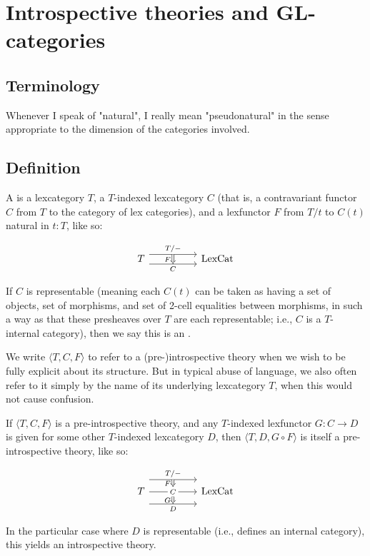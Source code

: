 \section{Introspective theories and GL-categories}

\subsection{Terminology}
Whenever I speak of "natural", I really mean "pseudonatural" in the sense appropriate to the dimension of the categories involved.

\subsection{Definition}
\begin{definition}
A  is a lexcategory $T$, a $T$-indexed lexcategory $C$ (that is, a contravariant functor $C$ from $T$ to the category of lex categories), and a lexfunctor $F$ from $T/t$ to $C(t)$ natural in $t : T$, like so:

\[\begin{tikzcd}
	{T} && {\LexCat}
	\arrow["{T/-}"{name=0}, from=1-1, to=1-3, shift left=2]
	\arrow["{C}"{name=1, swap}, from=1-1, to=1-3, shift right=2]
	\arrow[Rightarrow, "{F}"', from=0, to=1]
\end{tikzcd}\]

If $C$ is representable (meaning each $C(t)$ can be taken as having a set of objects, set of morphisms, and set of 2-cell equalities between morphisms, in such a way as that these presheaves over $T$ are each representable; i.e., $C$ is a $T$-internal category), then we say this is an .
\end{definition}

We write $\langle T, C, F \rangle$ to refer to a (pre-)introspective theory when we wish to be fully explicit about its structure. But in typical abuse of language, we also often refer to it simply by the name of its underlying lexcategory $T$, when this would not cause confusion.

\begin{construction}
If $\langle T, C, F \rangle$ is a pre-introspective theory, and any $T$-indexed lexfunctor $G : C \to D$ is given for some other $T$-indexed lexcategory $D$, then $\langle T, D, G \circ F \rangle$ is itself a pre-introspective theory, like so: 

\[\begin{tikzcd}
	{T} && {\LexCat}
	\arrow["{T/-}"{name=0}, from=1-1, to=1-3, shift left=5]
	\arrow["{C}"{name=1, description}, from=1-1, to=1-3]
	\arrow["{D}"{name=2, swap}, from=1-1, to=1-3, shift right=5]
	\arrow[Rightarrow, "{F}"', from=0, to=1]
	\arrow[Rightarrow, "{G}"', from=1, to=2]
\end{tikzcd}\]

In the particular case where $D$ is representable (i.e., defines an internal category), this yields an introspective theory.
\end{construction}

